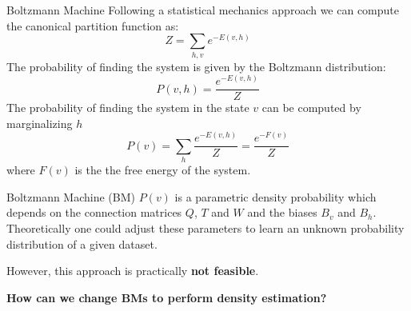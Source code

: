 \documentclass[10pt]{beamer}
\begin{document}
\begin{frame}{Boltzmann Machine}
   Following a statistical mechanics approach we can compute the canonical partition function as:
   \begin{equation*}
        Z = \sum_{h,v} e^{- E(v,h)}
   \end{equation*}
   The probability of finding the system is given by the Boltzmann distribution:
\begin{equation*}
    P(v, h) = \frac{e^{- E(v,h)}}{Z}
\end{equation*}
The probability of finding the system in the state $v$ can be computed by marginalizing $h$
\begin{equation*}
    P(v) = \sum_h \frac{e^{- E(v,h)}}{Z} = \frac{e^{- F(v)}}{Z}
\end{equation*}   
where $F(v)$ is the the free energy of the system.
\end{frame}


\begin{frame}{Boltzmann Machine (BM)}
    $P(v)$ is a parametric density probability which depends on the connection matrices $Q$, $T$ and $W$ and
    the biases $B_v$ and $B_h$. Theoretically one could adjust these parameters to learn an unknown probability
    distribution of a given dataset.
    
    \vspace{1cm}
    However, this approach is practically \textbf{not feasible}.
    \vspace{1cm}

    \textbf{How can we change BMs to perform density estimation?}
\end{frame}
\end{document}
